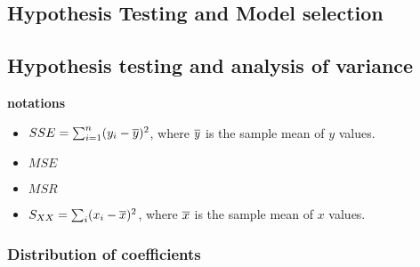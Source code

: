 \begin{refsection}
\section{Hypothesis Testing and Model selection}

\subsection{Hypothesis testing and analysis of variance}
\begin{mdframed}
	\textbf{notations}
	\begin{itemize}
		\item $SSE = \sum_{i=1}^n (y_i - \overline{y})^2$, where $\overline{y}$ is the sample mean of $y$ values.
		\item $MSE$
		\item $MSR$
		\item $S_{XX} = \sum_i (x_{i}-\overline{x})^2$, where $\overline{x}$ is the sample mean of $x$ values.
	\end{itemize}
\end{mdframed}

\subsubsection{Distribution of coefficients}


\end{refsection}
